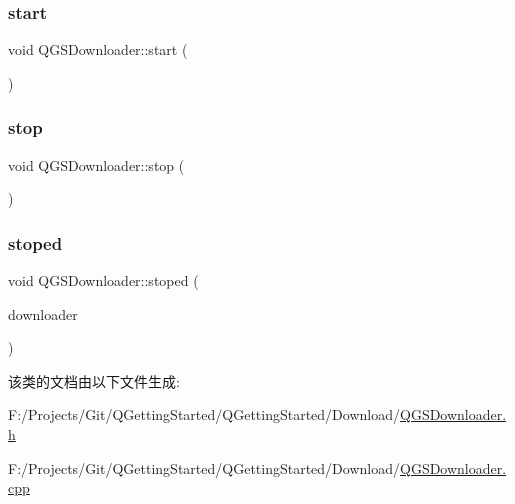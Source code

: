 \mbox{\label{class_q_g_s_downloader_a6f16693d52924ab54712c16372da77eb}} 
\subsubsection{\texorpdfstring{start}{start}}
{\footnotesize\ttfamily void Q\+G\+S\+Downloader\+::start (\begin{DoxyParamCaption}{ }\end{DoxyParamCaption})\hspace{0.3cm}{\ttfamily [slot]}}

\mbox{\label{class_q_g_s_downloader_af5b0de5b091826b2b950537aefbe160f}} 
\subsubsection{\texorpdfstring{stop}{stop}}
{\footnotesize\ttfamily void Q\+G\+S\+Downloader\+::stop (\begin{DoxyParamCaption}{ }\end{DoxyParamCaption})\hspace{0.3cm}{\ttfamily [slot]}}

\mbox{\label{class_q_g_s_downloader_ae8d2dc514cfbba8a039ef7703b2c1c4a}} 
\subsubsection{\texorpdfstring{stoped}{stoped}}
{\footnotesize\ttfamily void Q\+G\+S\+Downloader\+::stoped (\begin{DoxyParamCaption}\item[{\mbox{\hyperlink{class_q_g_s_downloader}{Q\+G\+S\+Downloader}} $\ast$}]{downloader }\end{DoxyParamCaption})\hspace{0.3cm}{\ttfamily [signal]}}



该类的文档由以下文件生成\+:\begin{DoxyCompactItemize}
\item 
F\+:/\+Projects/\+Git/\+Q\+Getting\+Started/\+Q\+Getting\+Started/\+Download/\mbox{\hyperlink{_q_g_s_downloader_8h}{Q\+G\+S\+Downloader.\+h}}\item 
F\+:/\+Projects/\+Git/\+Q\+Getting\+Started/\+Q\+Getting\+Started/\+Download/\mbox{\hyperlink{_q_g_s_downloader_8cpp}{Q\+G\+S\+Downloader.\+cpp}}\end{DoxyCompactItemize}
